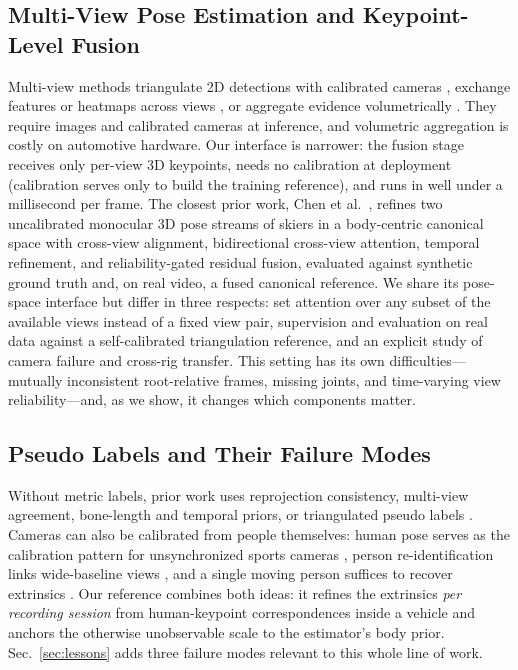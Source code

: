 \documentclass[journal]{IEEEtran}
\begin{document}
\subsection{Multi-View Pose Estimation and Keypoint-Level Fusion}
Multi-view methods triangulate 2D detections with calibrated cameras \cite{hartley1997triangulation,iskakov2019learnable}, exchange features or heatmaps across views \cite{qiu2019cross,he2020epipolar}, or aggregate evidence volumetrically \cite{tu2020voxelpose,bultmann2021real,nogueira2024markerless}. They require images and calibrated cameras at inference, and volumetric aggregation is costly on automotive hardware. Our interface is narrower: the fusion stage receives only per-view 3D keypoints, needs no calibration at deployment (calibration serves only to build the training reference), and runs in well under a millisecond per frame. The closest prior work, Chen et al.~\cite{chen2026canonfuse3d}, refines two uncalibrated monocular 3D pose streams of skiers in a body-centric canonical space with cross-view alignment, bidirectional cross-view attention, temporal refinement, and reliability-gated residual fusion, evaluated against synthetic ground truth and, on real video, a fused canonical reference. We share its pose-space interface but differ in three respects: set attention over any subset of the available views instead of a fixed view pair, supervision and evaluation on real data against a self-calibrated triangulation reference, and an explicit study of camera failure and cross-rig transfer. This setting has its own difficulties---mutually inconsistent root-relative frames, missing joints, and time-varying view reliability---and, as we show, it changes which components matter.

\subsection{Pseudo Labels and Their Failure Modes}
Without metric labels, prior work uses reprojection consistency, multi-view agreement, bone-length and temporal priors, or triangulated pseudo labels \cite{rhodin2018learning,kocabas2019self,iskakov2019learnable,wandt2021canonpose,fan2023humanm3}. Cameras can also be calibrated from people themselves: human pose serves as the calibration pattern for unsynchronized sports cameras \cite{takahashi2018human}, person re-identification links wide-baseline views \cite{xu2021wide}, and a single moving person suffices to recover extrinsics \cite{lee2022extrinsic}. Our reference combines both ideas: it refines the extrinsics \emph{per recording session} from human-keypoint correspondences inside a vehicle and anchors the otherwise unobservable scale to the estimator's body prior. Sec.~\ref{sec:lessons} adds three failure modes relevant to this whole line of work.
\end{document}
